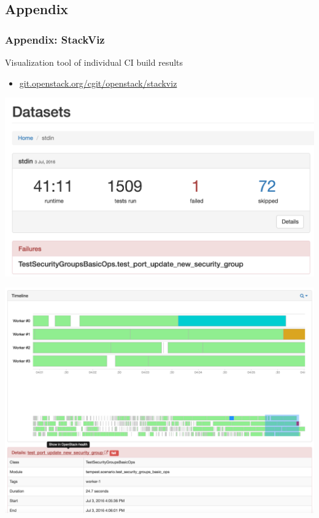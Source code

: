 \documentclass[aspectratio=43,11pt,hyperref={colorlinks=true}]{beamer}
\begin{document}
\subsection{Appendix}
\begin{frame}
  \frametitle{Appendix: StackViz}
  Visualization tool of individual CI build results
  \begin{itemize}
    \item \href{http://git.openstack.org/cgit/openstack/stackviz}{git.openstack.org/cgit/openstack/stackviz}
  \end{itemize}
  \begin{center}
    \includegraphics[width=1.0\textheight]{stackviz-sample-top.png}
  \end{center}
\end{frame}

\begin{frame}
  \begin{center}
    \includegraphics[width=1.0\textheight]{stackviz-sample-timeline.png}
  \end{center}
\end{frame}
\end{document}
